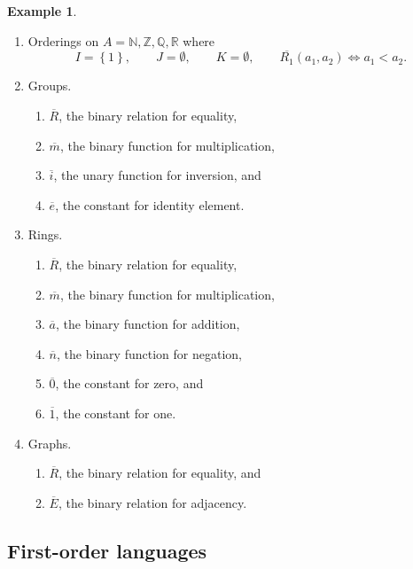 \documentclass{article}
\newcommand{\N}{\mathbb{N}}
\newcommand{\Z}{\mathbb{Z}}
\newcommand{\Q}{\mathbb{Q}}
\newcommand{\R}{\mathbb{R}}
\newcommand{\rb}[1]{\left( #1 \right)}
\newcommand{\cb}[1]{\left\{ #1 \right\}}
\theoremstyle{definition}\newtheorem{definition}{Definition}[subsection]
\theoremstyle{definition}\newtheorem{remark}[definition]{Remark}
\theoremstyle{definition}\newtheorem*{example}{Example}
\theoremstyle{definition}\newtheorem*{note}{Note}
\begin{document}
\begin{example}
\hfill
\begin{enumerate}
\item Orderings on $ A = \N, \Z, \Q, \R $ where
$$ I = \cb{1}, \qquad J = \emptyset, \qquad K = \emptyset, \qquad \overline{R_1}\rb{a_1, a_2} \iff a_1 < a_2. $$
\item Groups.
\begin{enumerate}
\item $ \overline{R} $, the binary relation for equality,
\item $ \overline{m} $, the binary function for multiplication,
\item $ \overline{i} $, the unary function for inversion, and
\item $ \overline{e} $, the constant for identity element.
\end{enumerate}
\item Rings.
\begin{enumerate}
\item $ \overline{R} $, the binary relation for equality,
\item $ \overline{m} $, the binary function for multiplication,
\item $ \overline{a} $, the binary function for addition,
\item $ \overline{n} $, the binary function for negation,
\item $ \overline{0} $, the constant for zero, and
\item $ \overline{1} $, the constant for one.
\end{enumerate}
\item Graphs.
\begin{enumerate}
\item $ \overline{R} $, the binary relation for equality, and
\item $ \overline{E} $, the binary relation for adjacency.
\end{enumerate}
\end{enumerate}
\end{example}

\subsection{First-order languages}
\end{document}
